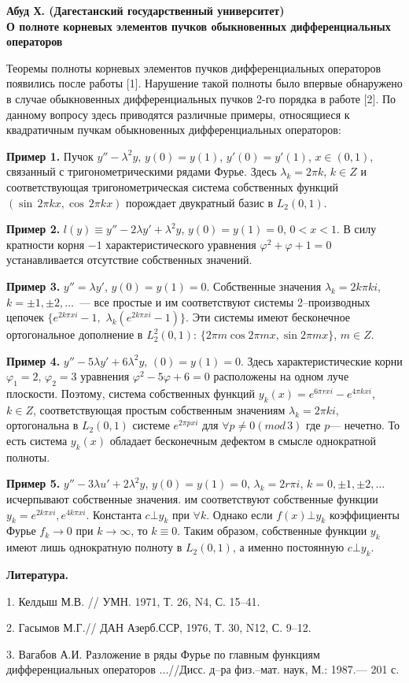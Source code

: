 \begin{center}
{\bf Абуд Х. (Дагестанский государственный университет)\\
О полноте корневых элементов пучков обыкновенных дифференциальных операторов}
\end{center}

Теоремы полноты корневых элементов пучков дифференциальных операторов появились после работы  [1]. Нарушение такой полноты было впервые обнаружено в случае обыкновенных дифференциальных пучков 2-го порядка в работе [2]. По данному вопросу здесь приводятся различные примеры, относящиеся к квадратичным пучкам обыкновенных дифференциальных операторов:

{\bf Пример 1.} Пучок $y''-\lambda^2y$, $y(0)=y(1)$, $y'(0)=y'(1)$, $x\in(0,1)$, связанный с тригонометрическими рядами Фурье. Здесь $\lambda_k=2\pi k$, $k\in Z$ и соответствующая тригонометрическая система собственных функций $(\sin\,2\pi k x,\cos\,2\pi k x)$ порождает двукратный базис в $L_2(0,1)$.

{\bf Пример 2.} $l(y)\equiv y''-2\lambda y'+\lambda^2y$, $y(0)=y(1)=0$, $0<x<1$. В силу кратности корня $-1$ характеристического уравнения $\varphi^2+\varphi+1=0$ устанавливается отсутствие  собственных значений.

{\bf Пример 3.}
$y''=\lambda y'$, $y(0)=y(1)=0$.
Собственные значения $\lambda_k=2k\pi k i$, $k=\pm1,\pm2,\dots$~--- все простые
и им соответствуют системы 2--производных цепочек $\{e^{2k\pi xi}-1,$ $\lambda_k(e^{2k\pi xi}-1)\}$.
Эти системы имеют бесконечное ортогональное дополнение в
$L_2^2(0,1)$: $\{2\pi m\cos2\pi mx,\sin 2\pi mx\}$, $m\in Z$.

{\bf Пример 4.} $y''-5\lambda y'+6\lambda^2y$, $(0)=y(1)=0$. Здесь характеристические корни $\varphi_1=2$, $\varphi_2=3$ уравнения $\varphi^2-5\varphi+6=0$ расположены на одном луче плоскости. Поэтому, система собственных функций $y_k(x)=e^{6\pi r xi}-e^{4\pi k xi}$, $k\in Z$, соответствующая простым собственным значениям $\lambda_k=2\pi k i$, ортогональна в $L_2(0,1)$ системе $e^{2\pi pxi}$ для $\forall p\neq 0(mod\,3)$ где $p$--- нечетно. То есть система $y_k(x)$ обладает бесконечным дефектом в смысле однократной полноты.

{\bf Пример 5.} $y''-3\lambda u'+2\lambda^2y$, $y(0)=y(1)=0$, $\lambda_k=2r\pi i$, $k=0,\pm1,\pm2,\dots$ исчерпывают собственные значения. им соответствуют собственные функции $y_k=e^{2k\pi xi},e^{4k\pi xi}$. Константа $c\bot y_k$ при $\forall k$. Однако если $f(x)\bot y_k$ коэффициенты Фурье $f_k\to0$ при $k\to\infty$, то $k\equiv0$. Таким образом, собственные функции $y_k$ имеют лишь однократную полноту в $L_2(0,1)$, а именно постоянную $c\bot y_k$.

{\bf Литература.}

1. Келдыш М.В. // УМН. 1971, Т. 26, N4, С. 15--41.

2. Гасымов М.Г.// ДАН Азерб.ССР, 1976, Т. 30, N12, С. 9--12.

3. Вагабов А.И. Разложение в ряды Фурье по главным функциям дифференциальных операторов ...//Дисс. д--ра физ.--мат. наук, М.: 1987.--- 201 с.
